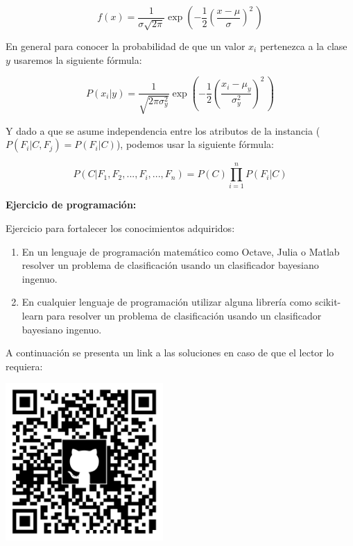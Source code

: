 \documentclass[11pt,fleqn]{book} %
\begin{document}
\begin{equation}
 f(x) = \frac{1}{\sigma\sqrt{2\pi}} 
  \exp\left( -\frac{1}{2}\left(\frac{x-\mu}{\sigma}\right)^{\!2}\,\right)
\end{equation}

En general para conocer la probabilidad de que un valor $x_i$ pertenezca a la clase $y$ usaremos la siguiente fórmula:

\begin{equation}
 P(x_i | y) = \frac{1}{ \sqrt{ 2 \pi \sigma_{y}^{2} } } 
  \exp\left( -\frac{1}{2}\left(\frac{x_i -\mu_{y}}{\sigma_{y}^{2}}\right)^{\!2}\,\right)
\end{equation}

Y dado a que se asume independencia entre los atributos de la instancia ($P(F_{i}\vert C,F_{j})=P(F_{i}\vert C)$), podemos usar la siguiente fórmula:

\begin{equation}
P(C|F_{1},F_{2},...,F_{i},...,F_{n}) = P(C) \prod_{i=1}^n P(F_i \vert C)
\label{eqn:clasificadorBayesianoFinal2} 
\end{equation}

\textbf{Ejercicio de programación:}

Ejercicio para fortalecer los conocimientos adquiridos:

\begin{enumerate}
\item En un lenguaje de programación matemático como Octave, Julia o Matlab resolver un problema de clasificación usando un clasificador bayesiano ingenuo.
\item En cualquier lenguaje de programación utilizar alguna librería como scikit-learn para resolver un problema de clasificación usando un clasificador bayesiano ingenuo.
\end{enumerate}

A continuación se presenta un link a las soluciones en caso de que el lector lo requiera:

\includegraphics[width=6cm]{Pictures/github/libro-ia.png}
\end{document}
